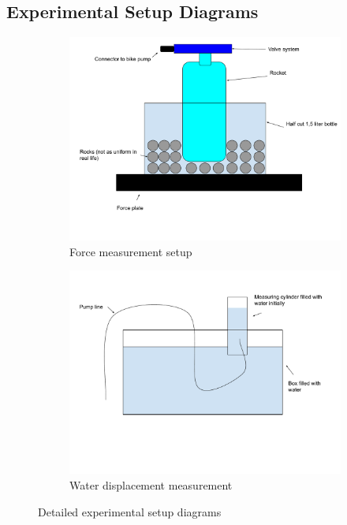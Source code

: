\documentclass[12pt,a4paper]{article}
\begin{document}
\subsection{Experimental Setup Diagrams}

\begin{figure}[H]
\centering
\begin{subfigure}{0.45\textwidth}
    \centering
    \includegraphics[width=\textwidth]{measuring force.pdf}
    \caption{Force measurement setup}
    \label{fig:force_setup}
\end{subfigure}
\hfill
\begin{subfigure}{0.45\textwidth}
    \centering
    \includegraphics[width=\textwidth]{measuring the water displacement.pdf}
    \caption{Water displacement measurement}
    \label{fig:water_setup}
\end{subfigure}
\caption{Detailed experimental setup diagrams}
\label{fig:setup_diagrams}
\end{figure}
\end{document}
